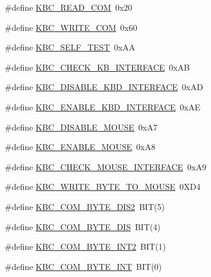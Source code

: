 \begin{DoxyCompactItemize}
\item 
\#define \hyperlink{group__kbc_ga67a2de56fabfdf65bfa20c50f8b77422}{K\+B\+C\+\_\+\+R\+E\+A\+D\+\_\+\+C\+OM}~0x20
\item 
\#define \hyperlink{group__kbc_ga09cb7b27cd3f4d0408f453da78ca294e}{K\+B\+C\+\_\+\+W\+R\+I\+T\+E\+\_\+\+C\+OM}~0x60
\item 
\#define \hyperlink{group__kbc_ga3add1395817336a078643ed6e0175ad6}{K\+B\+C\+\_\+\+S\+E\+L\+F\+\_\+\+T\+E\+ST}~0x\+AA
\item 
\#define \hyperlink{group__kbc_gab389a48497ca01296ca29c83c8eab2cd}{K\+B\+C\+\_\+\+C\+H\+E\+C\+K\+\_\+\+K\+B\+\_\+\+I\+N\+T\+E\+R\+F\+A\+CE}~0x\+AB
\item 
\#define \hyperlink{group__kbc_ga80e8aea5305350df2cc8811712caa6cc}{K\+B\+C\+\_\+\+D\+I\+S\+A\+B\+L\+E\+\_\+\+K\+B\+D\+\_\+\+I\+N\+T\+E\+R\+F\+A\+CE}~0x\+AD
\item 
\#define \hyperlink{group__kbc_ga728cbb4bd95a78097c116e7d4ce099a8}{K\+B\+C\+\_\+\+E\+N\+A\+B\+L\+E\+\_\+\+K\+B\+D\+\_\+\+I\+N\+T\+E\+R\+F\+A\+CE}~0x\+AE
\item 
\#define \hyperlink{group__kbc_ga1feec59f57ba28933fbe3516f30b1d14}{K\+B\+C\+\_\+\+D\+I\+S\+A\+B\+L\+E\+\_\+\+M\+O\+U\+SE}~0x\+A7
\item 
\#define \hyperlink{group__kbc_ga2c0f7ed5ff3b86d06f0e95600a5f736f}{K\+B\+C\+\_\+\+E\+N\+A\+B\+L\+E\+\_\+\+M\+O\+U\+SE}~0x\+A8
\item 
\#define \hyperlink{group__kbc_ga19f3f409be0e3cfa750c56408ef50f92}{K\+B\+C\+\_\+\+C\+H\+E\+C\+K\+\_\+\+M\+O\+U\+S\+E\+\_\+\+I\+N\+T\+E\+R\+F\+A\+CE}~0x\+A9
\item 
\#define \hyperlink{group__kbc_ga27c4267800118ec8c413f75f0bc45dc3}{K\+B\+C\+\_\+\+W\+R\+I\+T\+E\+\_\+\+B\+Y\+T\+E\+\_\+\+T\+O\+\_\+\+M\+O\+U\+SE}~0\+X\+D4
\item 
\#define \hyperlink{group__kbc_ga474cbc1b6540f557c0440d718b288ddd}{K\+B\+C\+\_\+\+C\+O\+M\+\_\+\+B\+Y\+T\+E\+\_\+\+D\+I\+S2}~B\+IT(5)
\item 
\#define \hyperlink{group__kbc_ga698b737cbe2182ee299347f00bc55ac1}{K\+B\+C\+\_\+\+C\+O\+M\+\_\+\+B\+Y\+T\+E\+\_\+\+D\+IS}~B\+IT(4)
\item 
\#define \hyperlink{group__kbc_ga35fe39f07554845d7c27a0b8d775cf25}{K\+B\+C\+\_\+\+C\+O\+M\+\_\+\+B\+Y\+T\+E\+\_\+\+I\+N\+T2}~B\+IT(1)
\item 
\#define \hyperlink{group__kbc_ga0574cae4394dc24a596d50361f31a1b3}{K\+B\+C\+\_\+\+C\+O\+M\+\_\+\+B\+Y\+T\+E\+\_\+\+I\+NT}~B\+IT(0)
\end{DoxyCompactItemize}
